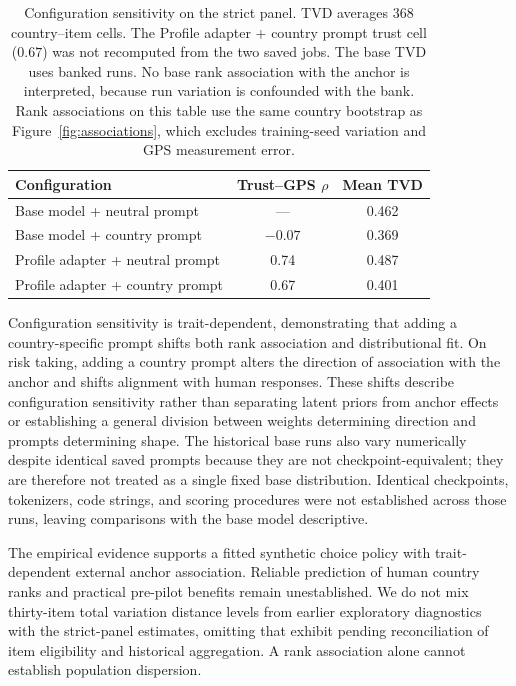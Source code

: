 \begin{table}[htbp]\centering\small
\caption{Configuration sensitivity on the strict panel. TVD averages 368 country--item cells. The Profile adapter + country prompt trust cell ($0.67$) was not recomputed from the two saved jobs. The base TVD uses banked runs. No base rank association with the anchor is interpreted, because run variation is confounded with the bank. Rank associations on this table use the same country bootstrap as Figure~\ref{fig:associations}, which excludes training-seed variation and GPS measurement error.}\label{tab:twobytwo}
\begin{tabular}{lcc}\toprule
Configuration & Trust--GPS $\rho$ & Mean TVD\\\midrule
Base model + neutral prompt & --- & 0.462\\
Base model + country prompt & $-0.07$ & 0.369\\
Profile adapter + neutral prompt & 0.74 & 0.487\\
Profile adapter + country prompt & 0.67 & 0.401\\\bottomrule
\end{tabular}\end{table}

Configuration sensitivity is trait-dependent, demonstrating that adding a country-specific prompt shifts both rank association and distributional fit. On risk taking, adding a country prompt alters the direction of association with the anchor and shifts alignment with human responses. These shifts describe configuration sensitivity rather than separating latent priors from anchor effects or establishing a general division between weights determining direction and prompts determining shape. The historical base runs also vary numerically despite identical saved prompts because they are not checkpoint-equivalent; they are therefore not treated as a single fixed base distribution. Identical checkpoints, tokenizers, code strings, and scoring procedures were not established across those runs, leaving comparisons with the base model descriptive.

The empirical evidence supports a fitted synthetic choice policy with trait-dependent external anchor association. Reliable prediction of human country ranks and practical pre-pilot benefits remain unestablished. We do not mix thirty-item total variation distance levels from earlier exploratory diagnostics with the strict-panel estimates, omitting that exhibit pending reconciliation of item eligibility and historical aggregation. A rank association alone cannot establish population dispersion.
